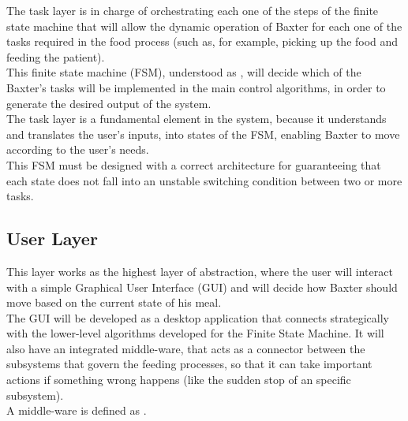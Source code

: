 \documentclass[11pt]{report} %
\begin{document}
The task layer is in charge of orchestrating each one of the steps of the finite state machine that will allow the dynamic operation of Baxter for each one of the tasks required in the food process (such as, for example, picking up the food and feeding the patient).\\

This finite state machine (FSM), understood as  \citep{cite_finite_state_machine_brilliant}, will decide which of the Baxter's tasks will be implemented in the main control algorithms, in order to generate the desired output of the system.\\

The task layer is a fundamental element in the system, because it understands and translates the user's inputs, into states of the FSM, enabling Baxter to move according to the user's needs.\\

This FSM must be designed with a correct architecture for guaranteeing that each state does not fall into an unstable switching condition between two or more tasks.\\

\subsection{User Layer}

This layer works as the highest layer of abstraction, where the user will interact with a simple Graphical User Interface (GUI) and will decide how Baxter should move based on the current state of his meal.\\

The GUI will be developed as a desktop application that connects strategically with the lower-level algorithms developed for the Finite State Machine. It will also have an integrated middle-ware,  that acts as a connector between the subsystems that govern the feeding processes, so that it can take important actions if something wrong happens (like the sudden stop of an specific subsystem).\\

A middle-ware is defined as  \citep{cite_middleware_definition_talend}.\\
\end{document}
